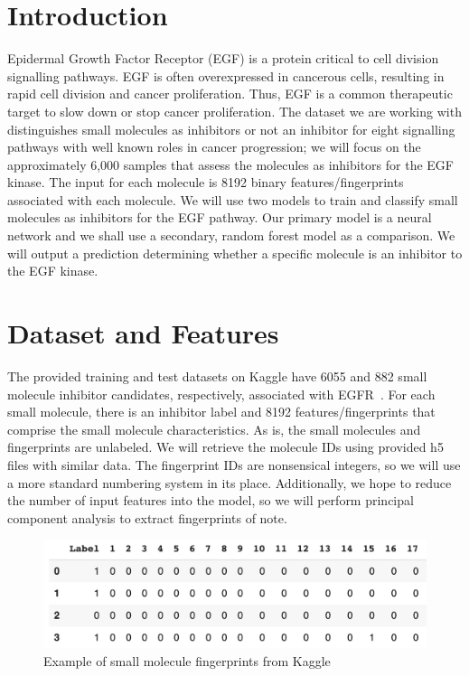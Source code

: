 \documentclass{article}
\begin{document}
\section{Introduction}
Epidermal Growth Factor Receptor (EGF) is a protein critical to cell division signalling pathways. EGF is often overexpressed in cancerous cells, resulting in rapid cell division and cancer proliferation. Thus, EGF is a common therapeutic target to slow down or stop cancer proliferation. The dataset we are working with distinguishes small molecules as inhibitors or not an inhibitor for eight signalling pathways with well known roles in cancer progression; we will focus on the approximately 6,000 samples that assess the molecules as inhibitors for the EGF kinase. The input for each molecule is 8192 binary features/fingerprints associated with each molecule. We will use two models to train and classify small molecules as inhibitors for the EGF pathway. Our primary model is a neural network and we shall use a secondary, random forest model as a comparison. We will output a prediction determining whether a specific molecule is an inhibitor to the EGF kinase.

\section{Dataset and Features}
The provided training and test datasets on Kaggle have 6055 and 882 small molecule inhibitor candidates, respectively, associated with EGFR~\cite{inhibitordataset}. For each small molecule, there is an inhibitor label and 8192 features/fingerprints that comprise the small molecule characteristics. As is, the small molecules and fingerprints are unlabeled. We will retrieve the molecule IDs using provided h5 files with similar data. The fingerprint IDs are nonsensical integers, so we will use a more standard numbering system in its place. Additionally, we hope to reduce the number of input features into the model, so we will perform principal component analysis to extract fingerprints of note.

\begin{figure}
    \centering
    \includegraphics[width=18cm]{Data.png}
    \caption{Example of small molecule fingerprints from Kaggle}
    \label{}
\end{figure}
\end{document}
